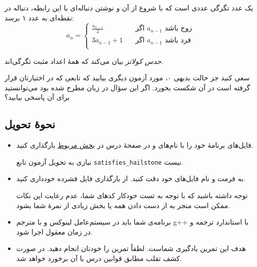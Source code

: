 \documentclass{utap}
\begin{document}
    یک عدد تگرگی عددی است که با شروع از آن و نوشتن دنباله‌ای با این رابطه، دنباله در نقطه‌ای به عدد ۱ برسد:
    \[ a_n =
      \begin{cases}
        \frac{a_{n - 1}}{2} & \quad \text{اگر $a_{n - 1}$ زوج باشد}\\
        3a_{n - 1} + 1 & \quad \text{اگر $a_{n - 1}$ فرد باشد}\\
      \end{cases}
    \]

    \textit{حدس کولاتز} بیان می‌کند که همهٔ اعداد مثبت تگرگی‌اند.

    سعی کنید جز حالت بدیهی ۰، مورد آزمون دیگری بیابید که تابعی که در اختیارتان قرار گرفته است در آن شکست بخورد. اگر این سؤال در زبان  مطرح شده بود می‌توانستید برای آن پاسخی بیابید؟

    \subsection{نحوهٔ تحویل}

    \begin{itemize}
    \item فایل‌های برنامهٔ خود را با نام‌های  و  در صفحهٔ  درس در \href{https://cecm.ut.ac.ir/mod/assign/view.php?id=76411}{بخش مربوط} بارگذاری کنید.\par
    نیازی به تحویل آزمون تابع \lstinline{satisfies_hailstone} نیست.
    \item به فرمت و نام فایل‌های خود دقت کنید. از بارگذاری فایل فشرده خودداری کنید.\par
    توجه داشته باشید که با توجه به تست خودکار کدهای شما، عدم رعایت این نکات ممکن است منجر به از دست دادن همه یا بخش زیادی از نمرهٔ شما بشود.
    \item برنامه‌ی شما باید در سیستم‌عامل لینوکس و با مترجم g++ با استاندارد  ترجمه و در زمان معقول اجرا شود.
    \item هدف این تمرین یادگیری شماست. لطفاً تمرین را خودتان انجام دهید. در صورت کشف تقلب مطابق قوانین درس با آن برخورد خواهد شد.
    \end{itemize}
\end{document}
